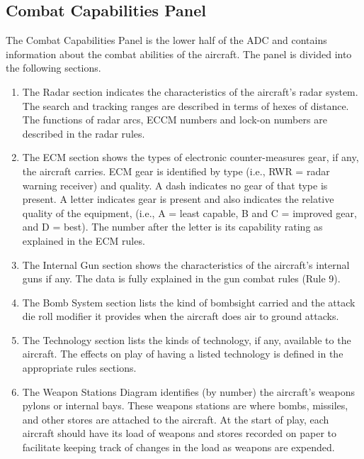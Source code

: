 \subsection{Combat Capabilities Panel}

The Combat Capabilities Panel is the lower half of the ADC and contains information about the combat abilities of the aircraft.  The panel is divided into the following sections.

\begin{enumerate}[resume]

    \item {} The Radar section indicates the characteristics of the aircraft's radar system. The search and tracking ranges are described in terms of hexes of distance. The functions of radar arcs, ECCM numbers and lock-on numbers are described in the radar rules.

    \item {} The ECM section shows the types of electronic counter-measures gear, if any, the aircraft carries. ECM gear is identified by type (i.e., RWR = radar warning receiver) and quality. A dash indicates no gear of that type is present. A letter indicates gear is present and also indicates the relative quality of the equipment, (i.e., A = least capable, B and C = improved gear, and D = best). The number after the letter is its capability rating as explained in the ECM rules.

    \item {} The Internal Gun section shows the characteristics of the aircraft's internal guns if any. The data is fully explained in the gun combat rules (Rule 9).

    \item {} The Bomb System section lists the kind of bombsight carried and the attack die roll modifier it provides when the aircraft does air to ground attacks.

    \item {} The Technology section lists the kinds of technology, if any, available to the aircraft. The effects on play of having a listed technology is defined in the appropriate rules sections.

    \item {} The Weapon Stations Diagram identifies (by number) the aircraft's weapons pylons or internal bays. These weapons stations are where bombs, missiles, and other stores are attached to the aircraft. At the start of play, each aircraft should have its load of weapons and stores recorded on paper to facilitate keeping track of changes in the load as weapons are expended.


\end{enumerate}
